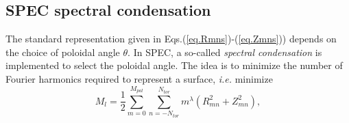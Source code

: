 \subsection{SPEC spectral condensation} \label{spec coord and spectral constraints}
%
%
The standard representation given in Eqs.(\ref{eq.Rmns})-(\ref{eq.Zmns})) depends on the choice of poloidal angle $\theta$. In SPEC, a so-called \emph{spectral condensation} \citep{Hirshman1986} is implemented to select the poloidal angle. The idea is to minimize the number of Fourier harmonics required to represent a surface, \textit{i.e.} minimize
\begin{equation}
	M_l = \frac{1}{2}\sum_{m=0}^{M_{pol}}\sum_{n=-N_{tor}}^{N_{tor}} m^\lambda (R_{mn}^2 + Z_{mn}^2), \label{eq.spectral width}
\end{equation}
